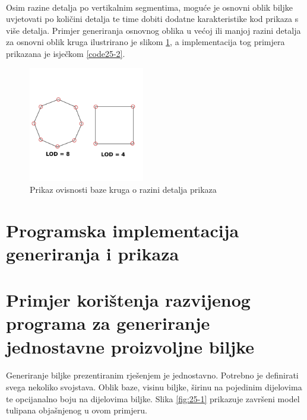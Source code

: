 \documentclass[times, utf8, diplomski]{fer}
\begin{document}
\paragraph{}
Osim razine detalja po vertikalnim segmentima, moguće je osnovni oblik biljke uvjetovati po 
količini detalja te time dobiti dodatne karakteristike kod prikaza s više detalja. Primjer 
generiranja osnovnog oblika u većoj ili manjoj razini detalja za osnovni oblik kruga 
ilustrirano je slikom \ref{fig:221-2}, a implementacija tog primjera prikazana je isječkom 
\ref{code25-2}.

\begin{figure}[h]
	\centering
	\includegraphics[width=0.45\textwidth]{img/221-2}
	\caption{Prikaz ovisnosti baze kruga o razini detalja prikaza}
	\label{fig:221-2}
\end{figure}

\section{Programska implementacija generiranja i prikaza}
\paragraph{}


\section{Primjer korištenja razvijenog programa za generiranje jednostavne proizvoljne biljke} \label{usage_tutorial}
\paragraph{}
Generiranje biljke prezentiranim rješenjem je jednostavno. Potrebno je definirati svega 
nekoliko svojstava. Oblik baze, visinu biljke, širinu na pojedinim dijelovima te opcijanalno 
boju na dijelovima biljke. Slika \ref{fig:25-1} prikazuje završeni model tulipana 
objašnjenog u ovom primjeru.
\end{document}
